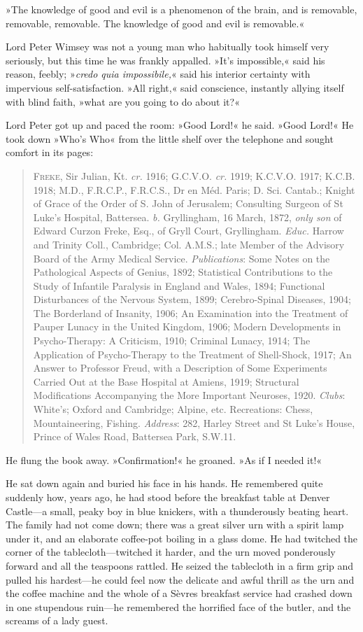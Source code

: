 »The knowledge of good and evil is a phenomenon of the brain, and is removable, removable, removable. The knowledge of good and evil is removable.«

Lord Peter Wimsey was not a young man who habitually took himself very seriously, but this time he was frankly appalled. »It's impossible,« said his reason, feebly; »\textit{credo quia impossibile,}« said his interior certainty with impervious self-satisfaction. »All right,« said conscience, instantly allying itself with blind faith, »what are you going to do about it?«

Lord Peter got up and paced the room: »Good Lord!« he said. »Good Lord!« He took down »Who's Who« from the little shelf over the telephone and sought comfort in its pages:

\begin{quote}
\textsc{Freke}, Sir Julian, Kt. \textit{cr.} 1916; G.C.V.O. \textit{cr.} 1919; K.C.V.O. 1917; K.C.B. 1918; M.D., F.R.C.P., F.R.C.S., Dr en Méd. Paris; D. Sci. Cantab.; Knight of Grace of the Order of S. John of Jerusalem; Consulting Surgeon of St Luke's Hospital, Battersea. \textit{b.} Gryllingham, 16 March, 1872, \textit{only son} of Edward Curzon Freke, Esq., of Gryll Court, Gryllingham. \textit{Educ.} Harrow and Trinity Coll., Cambridge; Col. A.M.S.; late Member of the Advisory Board of the Army Medical Service. \textit{Publications}: Some Notes on the Pathological Aspects of Genius, 1892; Statistical Contributions to the Study of Infantile Paralysis in England and Wales, 1894; Functional Disturbances of the Nervous System, 1899; Cerebro-Spinal Diseases, 1904; The Borderland of Insanity, 1906; An Examination into the Treatment of Pauper Lunacy in the United Kingdom, 1906; Modern Developments in Psycho-Therapy: A Criticism, 1910; Criminal Lunacy, 1914; The Application of Psycho-Therapy to the Treatment of Shell-Shock, 1917; An Answer to Professor Freud, with a Description of Some Experiments Carried Out at the Base Hospital at Amiens, 1919; Structural Modifications Accompanying the More Important Neuroses, 1920. \textit{Clubs}: White's; Oxford and Cambridge; Alpine, etc. Recreations: Chess, Mountaineering, Fishing. \textit{Address}: 282, Harley Street and St Luke's House, Prince of Wales Road, Battersea Park, S.W.11.
\end{quote}

He flung the book away. »Confirmation!« he groaned. »As if I needed it!«

He sat down again and buried his face in his hands. He remembered quite suddenly how, years ago, he had stood before the breakfast table at Denver Castle—a small, peaky boy in blue knickers, with a thunderously beating heart. The family had not come down; there was a great silver urn with a spirit lamp under it, and an elaborate coffee-pot boiling in a glass dome. He had twitched the corner of the tablecloth—twitched it harder, and the urn moved ponderously forward and all the teaspoons rattled. He seized the tablecloth in a firm grip and pulled his hardest—he could feel now the delicate and awful thrill as the urn and the coffee machine and the whole of a Sèvres breakfast service had crashed down in one stupendous ruin—he remembered the horrified face of the butler, and the screams of a lady guest.

